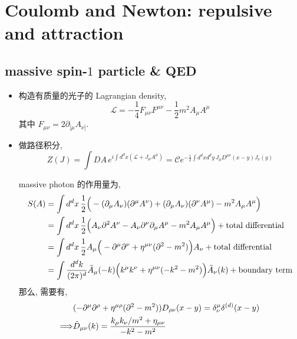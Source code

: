 \chapter{Coulomb and Newton: repulsive and attraction}
\section{massive spin-\texorpdfstring{$1$}{1} particle \& QED}
\begin{itemize}
	\item 构造有质量的光子的 Lagrangian density,
	\begin{equation} \label{2.1.1}
		\mathcal{L} = - \frac{1}{4} F_{\mu \nu} F^{\mu \nu} - \frac{1}{2} m^2 A_\mu A^\mu
	\end{equation}
	其中 $F_{\mu \nu} = 2 \partial_{[\mu} A_{\nu]}$.
	
	\item 做路径积分,
	\begin{equation}
		Z(J) = \int DA \, e^{i \int d^d x (\mathcal{L} + J_\mu A^\mu)} = \mathcal{C} e^{- \frac{i}{2} \int d^d x d^d y \, J_\mu D^{\mu \nu}(x - y) J_\nu(y)}
	\end{equation}
	
	\begin{tcolorbox}[title=calculation:]
		massive photon 的作用量为,
		\begin{align}
			S(A) &= \int d^d x \, \frac{1}{2} \Big( - (\partial_\mu A_\nu) (\partial^\mu A^\nu) + (\partial_\mu A_\nu) (\partial^\nu A^\mu) - m^2 A_\mu A^\mu \Big) \notag \\
			&= \int d^d x \, \frac{1}{2} \Big( A_\nu \partial^2 A^\nu - A_\nu \partial^\nu \partial_\mu A^\mu - m^2 A_\mu A^\mu \Big) + \text{total differential} \notag \\
			&= \int d^d x \, \frac{1}{2} A_\mu \Big( - \partial^\mu \partial^\nu + \eta^{\mu \nu} (\partial^2 - m^2) \Big) A_\nu + \text{total differential} \notag \\
			&= \int \frac{d^d k}{(2 \pi)^d} \tilde{A}_\mu(- k) \Big( k^\mu k^\nu + \eta^{\mu \nu} (- k^2 - m^2) \Big) \tilde{A}_\nu(k) + \text{boundary term}
		\end{align}
		那么, 需要有,
		\begin{align}
			& (- \partial^\mu \partial^\rho + \eta^{\mu \rho} (\partial^2 - m^2)) D_{\rho \nu}(x - y) = \delta^\mu_\nu \delta^{(d)}(x - y) \notag \\
			\Longrightarrow & \tilde{D}_{\mu \nu}(k) = \frac{k_\mu k_\nu / m^2 + \eta_{\mu \nu}}{- k^2 - m^2}
		\end{align}
	\end{tcolorbox}
	

\end{itemize}
